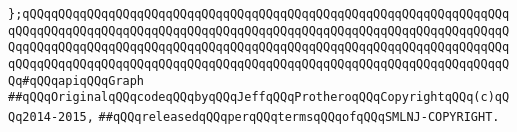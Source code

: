 \newline
\verb|};qQQqqQQqqQQqqQQqqQQqqQQqqQQqqQQqqQQqqQQqqQQqqQQqqQQqqQQqqQQqqQQqqQQqqQQqqQQqqQQqqQQqqQQqqQQqqQQqqQQqqQQqqQQqqQQqqQQqqQQqqQQqqQQqqQQqqQQqqQQqqQQqqQQqqQQqqQQqqQQqqQQqqQQqqQQqqQQqqQQqqQQqqQQqqQQqqQQqqQQqqQQqqQQqqQQqqQQqqQQqqQQqqQQqqQQqqQQqqQQqqQQqqQQqqQQqqQQqqQQqqQQqqQQqqQQqqQQqqQQq#qQQqapiqQQqGraph|\newline
\newline
\newline
\verb|##qQQqOriginalqQQqcodeqQQqbyqQQqJeffqQQqProtheroqQQqCopyrightqQQq(c)qQQq2014-2015,|\newline
\verb|##qQQqreleasedqQQqperqQQqtermsqQQqofqQQqSMLNJ-COPYRIGHT.|\newline

